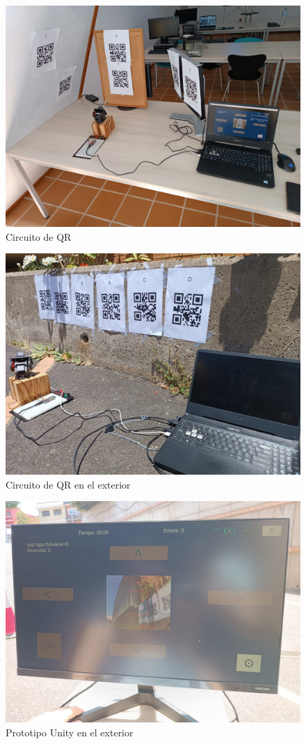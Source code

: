 \begin{figure}[!htb]
   \centering
    \includegraphics[width=0.7\linewidth]{figures/entorno-prueba.jpg}
   \caption{Circuito de QR}
   \label{figure:entorno-prueba}
\end{figure}

\begin{figure}[!htb]
   \centering
    \includegraphics[width=0.7\linewidth]{figures/entorno-prueba-exterior.jpg}
   \caption{Circuito de QR en el exterior}
   \label{figure:entorno-prueba-exterior}
\end{figure}


\begin{figure}[!htb]
   \centering
    \includegraphics[width=0.6\linewidth]{figures/aplicacion-exterior.jpg}
   \caption{Prototipo Unity en el exterior}
   \label{figure:aplicacion-exterior}
\end{figure}



